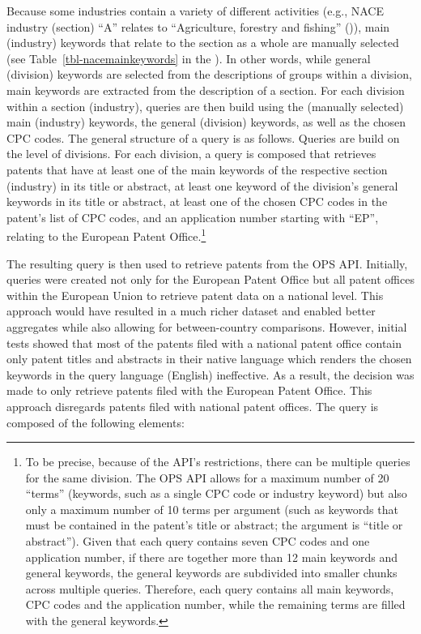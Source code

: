 \documentclass[
  12pt,
  a4paperpaper,
]{article}
\begin{document}
Because some industries contain a variety of different activities (e.g.,
NACE industry (section) ``A'' relates to ``Agriculture, forestry and
fishing''
()), main (industry) keywords that relate to
the section as a whole are manually selected (see
Table~\ref{tbl-nacemainkeywords} in the ). In
other words, while general (division) keywords are selected from the
descriptions of groups within a division, main keywords are extracted
from the description of a section. For each division within a section
(industry), queries are then build using the (manually selected) main
(industry) keywords, the general (division) keywords, as well as the
chosen CPC codes. The general structure of a query is as follows.
Queries are build on the level of divisions. For each division, a query
is composed that retrieves patents that have at least one of the main
keywords of the respective section (industry) in its title or abstract,
at least one keyword of the division's general keywords in its title or
abstract, at least one of the chosen CPC codes in the patent's list of
CPC codes, and an application number starting with ``EP'', relating to
the European Patent Office.\footnote{To be precise, because of the API's
  restrictions, there can be multiple queries for the same division. The
  OPS API allows for a maximum number of 20 ``terms'' (keywords, such as
  a single CPC code or industry keyword) but also only a maximum number
  of 10 terms per argument (such as keywords that must be contained in
  the patent's title or abstract; the argument is ``title or
  abstract''). Given that each query contains seven CPC codes and one
  application number, if there are together more than 12 main keywords
  and general keywords, the general keywords are subdivided into smaller
  chunks across multiple queries. Therefore, each query contains all
  main keywords, CPC codes and the application number, while the
  remaining terms are filled with the general keywords.}

The resulting query is then used to retrieve patents from the OPS API.
Initially, queries were created not only for the European Patent Office
but all patent offices within the European Union to retrieve patent data
on a national level. This approach would have resulted in a much richer
dataset and enabled better aggregates while also allowing for
between-country comparisons. However, initial tests showed that most of
the patents filed with a national patent office contain only patent
titles and abstracts in their native language which renders the chosen
keywords in the query language (English) ineffective. As a result, the
decision was made to only retrieve patents filed with the European
Patent Office. This approach disregards patents filed with national
patent offices. The query is composed of the following elements:
\end{document}
